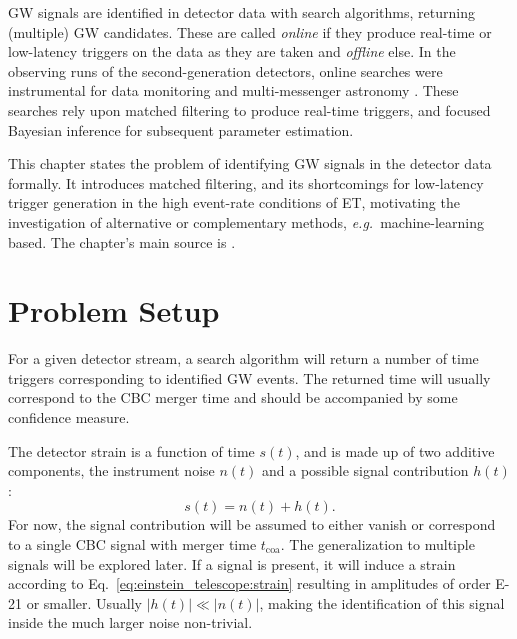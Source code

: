 
GW signals are identified in detector data with search algorithms, returning (multiple) GW candidates. 
These are called \emph{online} if they produce real-time or low-latency triggers on the data as they are taken and \emph{offline} else.
In the observing runs of the second-generation detectors, online searches were instrumental for data monitoring and multi-messenger astronomy \cite{Nitz_2018}. 
These searches rely upon matched filtering to produce real-time triggers, and focused Bayesian inference for subsequent parameter estimation. 

This chapter states the problem of identifying GW signals in the detector data formally. It introduces matched filtering, and its shortcomings for low-latency trigger generation in the high event-rate conditions of ET, motivating the investigation of alternative or complementary methods, \emph{e.g.}\ machine-learning based. The chapter's main source is \cite{10.1093/acprof:oso/9780198570745.001.0001}.

\section{Problem Setup}

For a given detector stream, a search algorithm will return a number of time triggers corresponding to identified GW events. The returned time will usually correspond to the CBC merger time and should be accompanied by some confidence measure. 

The detector strain is a function of time $s(t)$, and is made up of two additive components, the instrument noise $n(t)$ and a possible signal contribution $h(t)$:
\begin{equation}
	s(t) = n(t) + h(t).
\end{equation}
For now, the signal contribution will be assumed to either vanish or correspond to a single CBC signal with merger time $t_\text{coa}$. The generalization to multiple signals will be explored later.
If a signal is present, it will induce a strain according to Eq.~\ref{eq:einstein_telescope:strain} resulting in amplitudes of order \SI{E-21}{\nothing} or smaller.
Usually $|h(t)| \ll |n(t)|$, making the identification of this signal inside the much larger noise non-trivial.

